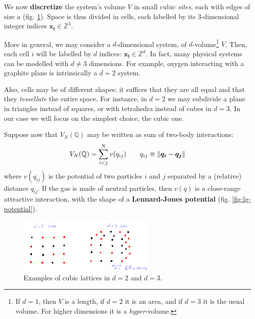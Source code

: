 \documentclass[../template.tex]{subfiles}
\begin{document}
We now \textbf{discretize} the system's volume $V$ in small cubic \textit{sites}, each with edges of size $a$ (fig. \ref{fig:lattices}). Space is thus divided in cells, each labelled by its $3$-dimensional integer indices $\bm{x_i} \in \mathbb{Z}^3$.

\medskip

More in general, we may consider a $d$-dimensional system, of $d$-volume\footnote{If $d=1$, then $V$ is a length, if $d=2$ it is an area, and if $d=3$ it is the usual volume. For higher dimensions it is a \textit{hyper}-volume.} $V$. Then, each cell $i$ will be labelled by $d$ indices: $\bm{x_i} \in \mathbb{Z}^d$. In fact, many physical systems can be modelled with $d\neq 3$ dimensions. For example, oxygen interacting with a graphite plane is intrinsically a $d=2$ system. 

\medskip

Also, cells may be of different shapes: it suffices that they are all equal and that they \textit{tessellate} the entire space. For instance, in $d=2$ we may subdivide a plane in triangles instead of squares, or with tetrahedra instead of cubes in $d=3$. In our case we will focus on the simplest choice, the cubic one. 

\medskip

Suppose now that $V_N(\mathbb{Q})$ may be written as sum of two-body interactions:
\begin{align} \label{eqn:two-body-potential}
    V_N(\mathbb{Q}) = \sum_{i < j}^N v(q_{ij}) \qquad q_{ij} \equiv \norm{\bm{q_i}- \bm{q_j}}
\end{align}
where $v(q_{ij})$ is the potential of two particles $i$ and $j$ separated by a (relative) distance $q_{ij}$. If the gas is made of neutral particles, then $v(q)$ is a close-range attractive interaction, with the shape of a \textbf{Lennard-Jones potential} (fig. \ref{fig:lg-potential}). 

\begin{figure}[H]
    \centering
    \includegraphics[width=0.6\textwidth]{image008.png}
    \caption{Examples of cubic lattices in $d=2$ and $d=3$.\label{fig:lattices}}
\end{figure}
\end{document}
